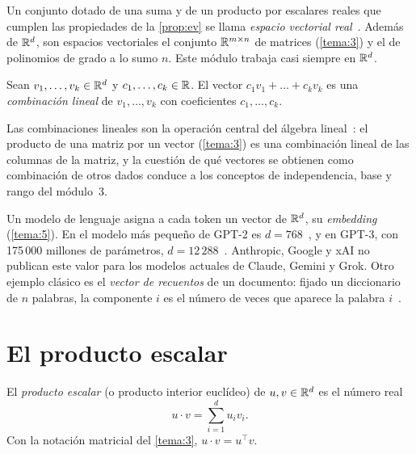 Un conjunto dotado de una suma y de un producto por escalares reales que cumplen las propiedades de la \cref{prop:ev} se llama \emph{espacio vectorial real}~\cite[§2.4]{mml}. Además de $\mathbb{R}^{d}$, son espacios vectoriales el conjunto $\mathbb{R}^{m\times n}$ de matrices (\cref{tema:3}) y el de polinomios de grado a lo sumo $n$. Este módulo trabaja casi siempre en $\mathbb{R}^{d}$.

\begin{definicion}
Sean $v_1,\dots,v_k\in\mathbb{R}^{d}$ y $c_1,\dots,c_k\in\mathbb{R}$. El vector $c_1v_1+\dots+c_kv_k$ es una \emph{combinación lineal} de $v_1,\dots,v_k$ con coeficientes $c_1,\dots,c_k$.
\end{definicion}

\addtocounter{definicion}{1}%

Las combinaciones lineales son la operación central del álgebra lineal~\cite[§1.1]{strang}: el producto de una matriz por un vector (\cref{tema:3}) es una combinación lineal de las columnas de la matriz, y la cuestión de qué vectores se obtienen como combinación de otros dados conduce a los conceptos de independencia, base y rango del módulo~3.

\begin{observacion}
Un modelo de lenguaje asigna a cada token un vector de $\mathbb{R}^{d}$, su \emph{embedding} (\cref{tema:5}). En el modelo más pequeño de GPT-2 es $d=768$~\cite{radford}, y en GPT-3, con 175\,000 millones de parámetros, $d=12\,288$~\cite[tabla~2.1]{brown}. Anthropic, Google y xAI no publican este valor para los modelos actuales de Claude, Gemini y Grok. Otro ejemplo clásico es el \emph{vector de recuentos} de un documento: fijado un diccionario de $n$ palabras, la componente $i$ es el número de veces que aparece la palabra $i$~\cite[§1.1]{vmls}.
\end{observacion}

\section{El producto escalar}

\begin{definicion}\label{def:escalar}
El \emph{producto escalar} (o producto interior euclídeo) de $u,v\in\mathbb{R}^{d}$ es el número real
\[
u\cdot v=\sum_{i=1}^{d}u_iv_i.
\]
Con la notación matricial del \cref{tema:3}, $u\cdot v=u^{\top}v$.
\end{definicion}

\addtocounter{definicion}{1}%

